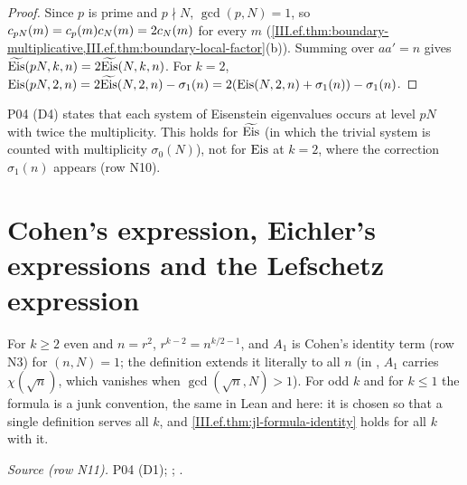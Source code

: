 \begin{theorem}[doubling]
\end{theorem}
\begin{proof}
Since $p$ is prime and $p\nmid N$, $\gcd(p,N)=1$, so $c_{pN}(m)=c_p(m)c_N(m)=2c_N(m)$ for every $m$
(\cref{III.ef.thm:boundary-multiplicative,III.ef.thm:boundary-local-factor}(b)). Summing over $aa'=n$ gives $\widetilde{\mathrm{Eis}}(pN,k,n)=2\widetilde{\mathrm{Eis}}(N,k,n)$. For $k=2$,
$\mathrm{Eis}(pN,2,n)=2\widetilde{\mathrm{Eis}}(N,2,n)-\sigma_1(n)=2(\mathrm{Eis}(N,2,n)+\sigma_1(n))-\sigma_1(n)$.
\end{proof}
\begin{remark}
P04 (D4) states that each system of Eisenstein eigenvalues occurs at level $pN$ with twice the multiplicity. This holds for $\widetilde{\mathrm{Eis}}$ (in which the
trivial system is counted with multiplicity $\sigma_0(N)$), not for $\mathrm{Eis}$ at $k=2$, where the correction $\sigma_1(n)$ appears (row N10).
\end{remark}

\section{Cohen's expression, Eichler's expressions and the Lefschetz expression}\label{sec:ef-expressions}

\begin{definition}
\end{definition}
\noindent For $k\ge2$ even and $n=r^2$, $r^{k-2}=n^{k/2-1}$, and $A_1$ is Cohen's identity term \cite[Thm.~12.4.11]{CoSt} (row N3) for $(n,N)=1$; the definition extends it literally to all $n$ (in \cite{CoSt}, $A_1$ carries $\chi(\sqrt n)$, which vanishes when $\gcd(\sqrt n,N)>1$). For odd $k$ and for
$k\le1$ the formula is a junk convention, the same in Lean and here: it is chosen so that a single definition serves all $k$, and
\cref{III.ef.thm:jl-formula-identity} holds for all $k$ with it.

\begin{definition}
\end{definition}
\noindent \emph{Source (row N11).} P04 (D1); \cite[Thm.~12.4.11]{CoSt}; \cite[Thm.~4.9]{Ass}.

